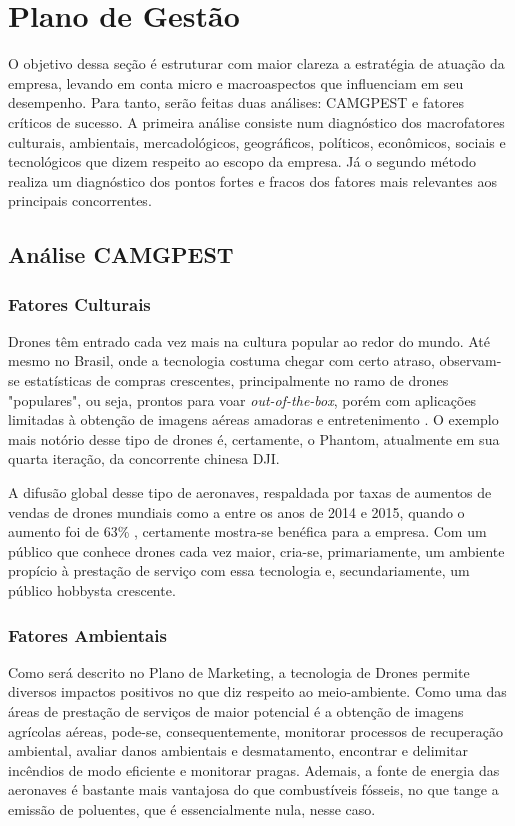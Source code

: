 \section{Plano de Gestão}

O objetivo dessa seção é estruturar com maior clareza a estratégia de atuação da empresa,
levando em conta micro e macroaspectos que influenciam em seu desempenho. Para tanto, serão 
feitas duas análises: CAMGPEST e fatores críticos de sucesso. A primeira análise consiste num 
diagnóstico dos macrofatores culturais, ambientais, mercadológicos, geográficos, políticos, 
econômicos, sociais e tecnológicos que dizem respeito ao escopo da empresa. Já o segundo método 
realiza um diagnóstico dos pontos fortes e fracos dos fatores mais relevantes aos principais 
concorrentes.

\subsection{Análise CAMGPEST}

\subsubsection*{Fatores Culturais}

Drones têm entrado cada vez mais na cultura popular ao redor do mundo. Até mesmo no Brasil, 
onde a tecnologia costuma chegar com certo atraso, observam-se estatísticas de compras crescentes, 
principalmente no ramo de drones "populares", ou seja, prontos para voar \emph{out-of-the-box}, porém com 
aplicações limitadas à obtenção de imagens aéreas amadoras e entretenimento \cite{brasildrones}. 
O exemplo mais notório desse tipo de drones é, 
certamente, o Phantom, atualmente em sua quarta iteração, da concorrente chinesa DJI.

A difusão global desse tipo de aeronaves, respaldada por taxas de aumentos de vendas de drones mundiais 
como a entre os anos de 2014 e 2015, quando o aumento foi de 63\% \cite{dronestats}, certamente 
mostra-se benéfica para a empresa. Com um público que conhece drones cada vez maior, cria-se, 
primariamente, um ambiente propício à prestação de serviço com essa tecnologia e, secundariamente, 
um público hobbysta crescente.

\subsubsection*{Fatores Ambientais}

Como será descrito no Plano de Marketing, a tecnologia de Drones permite diversos impactos positivos 
no que diz respeito ao meio-ambiente. Como uma das áreas de prestação de serviços de maior potencial 
é a obtenção de imagens agrícolas aéreas, pode-se, consequentemente, monitorar processos de recuperação 
ambiental, avaliar danos ambientais e desmatamento, encontrar e delimitar incêndios de modo eficiente e 
monitorar pragas. Ademais, a fonte de energia das aeronaves é bastante mais vantajosa do que combustíveis 
fósseis, no que tange a emissão de poluentes, que é essencialmente nula, nesse caso.

